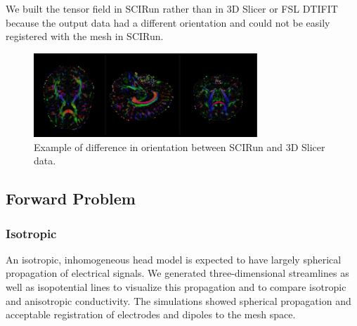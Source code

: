 We built the tensor field in SCIRun rather than in 3D Slicer \cite{ref:slicer} or FSL DTIFIT because the output data had a different orientation and could not be easily registered with the mesh in SCIRun.

\begin{figure}[H]
\begin{center}
\includegraphics[width=0.75\textwidth]{Figures/backwards.png}
\caption{Example of difference in orientation between SCIRun and 3D
  Slicer data.}
\label{fig:backwards}
\end{center}
\end{figure}

\subsection{Forward Problem}

\subsubsection{Isotropic}

An isotropic, inhomogeneous head model is expected to have largely spherical propagation of electrical signals. We generated three-dimensional streamlines as well as isopotential lines to visualize this propagation and to compare isotropic and anisotropic conductivity. The simulations showed spherical propagation and acceptable registration of electrodes and dipoles to the mesh space.

